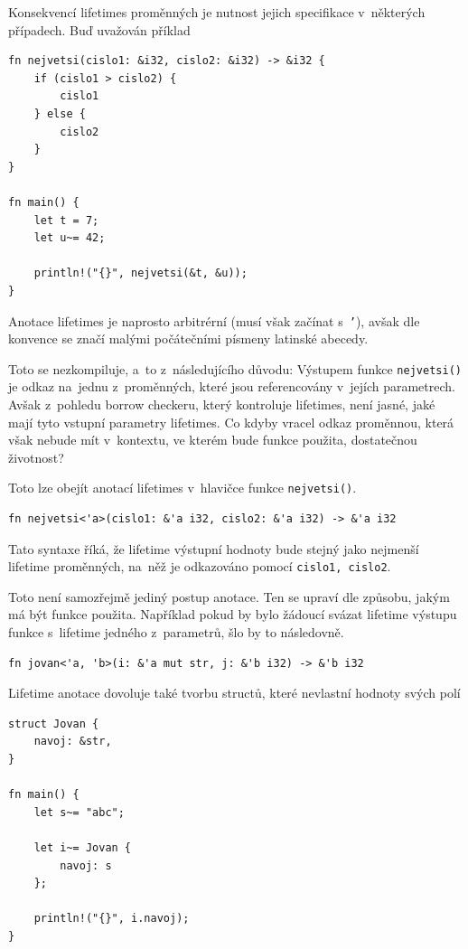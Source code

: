 \documentclass[a4paper, 12pt, twoside]{article} %
\newcommand{\rust}[1]{\texttt{#1}}
\begin{document}
				Konsekvencí lifetimes proměnných je nutnost jejich specifikace v~některých případech. Buď uvažován příklad
				\begin{verbatim}
fn nejvetsi(cislo1: &i32, cislo2: &i32) -> &i32 {
	if (cislo1 > cislo2) {
		cislo1
	} else {
		cislo2
	}
}

fn main() {
	let t = 7;
	let u~= 42;
	
	println!("{}", nejvetsi(&t, &u));
}
				\end{verbatim}
			
				Anotace lifetimes je naprosto arbitrérní (musí však začínat s~\rust{'}), avšak dle konvence se značí malými počátečními písmeny latinské abecedy.
				
				Toto se nezkompiluje, a~to z~následujícího důvodu: Výstupem funkce \rust{nejvetsi()} je odkaz na~jednu z~proměnných, které jsou referencovány v~jejích parametrech. Avšak z~pohledu borrow checkeru, který kontroluje lifetimes, není jasné, jaké mají tyto vstupní parametry lifetimes. Co kdyby vracel odkaz proměnnou, která však nebude mít v~kontextu, ve kterém bude funkce použita, dostatečnou životnost? 
				
				Toto lze obejít anotací lifetimes v~hlavičce funkce \rust{nejvetsi()}.
				\begin{verbatim}
fn nejvetsi<'a>(cislo1: &'a i32, cislo2: &'a i32) -> &'a i32
				\end{verbatim}
			
				Tato syntaxe říká, že lifetime výstupní hodnoty bude stejný jako nejmenší lifetime proměnných, na~něž je odkazováno pomocí \rust{cislo1, cislo2}.
				
				Toto není samozřejmě jediný postup anotace. Ten se upraví dle způsobu, jakým má být funkce použita. Například pokud by bylo žádoucí svázat lifetime výstupu funkce s~lifetime jedného z~parametrů, šlo by to následovně.
				\begin{verbatim}
fn jovan<'a, 'b>(i: &'a mut str, j: &'b i32) -> &'b i32
				\end{verbatim}
			
				Lifetime anotace dovoluje také tvorbu structů, které nevlastní hodnoty svých polí
				\begin{verbatim}
struct Jovan {
	navoj: &str,
}

fn main() {
	let s~= "abc";
	
	let i~= Jovan {
		navoj: s
	};
	
	println!("{}", i.navoj);
}
				\end{verbatim}
			
\end{document}
